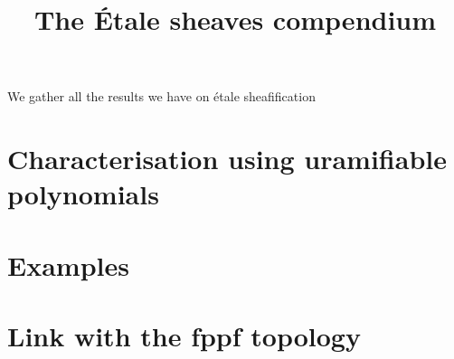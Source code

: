 \documentclass{../util/zariski}
\title{The \'Etale sheaves compendium}
\begin{document}
\maketitle

We gather all the results we have on \'etale sheafification

\tableofcontents

\section{Characterisation using uramifiable polynomials}


\section{Examples}


\section{Link with the fppf topology}




\printindex

\printbibliography
\end{document}

